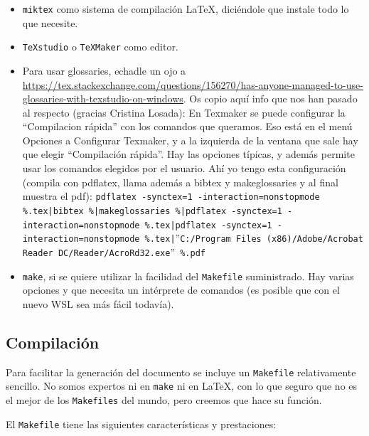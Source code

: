 \begin{itemize}
        \begin{itemize}
          \item \texttt{miktex} como sistema de compilación \LaTeX{}, diciéndole que instale todo lo que necesite.
          \item \texttt{TeXstudio} o \texttt{TeXMaker} como editor.
          \item Para usar glossaries, echadle un ojo a \url{https://tex.stackexchange.com/questions/156270/has-anyone-managed-to-use-glossaries-with-texstudio-on-windows}. Os copio aquí info que nos han pasado al respecto (gracias Cristina Losada): En Texmaker se puede configurar la “Compilacion rápida” con los comandos que queramos. Eso está en el menú Opciones a Configurar Texmaker, y a la izquierda de la ventana que sale hay que elegir “Compilación rápida”. Hay las opciones típicas, y además permite usar los comandos elegidos por el usuario. Ahí yo tengo esta configuración (compila con pdflatex, llama además a bibtex y makeglossaries y al final muestra el pdf): \texttt{pdflatex -synctex=1 -interaction=nonstopmode \%.tex|bibtex \%|makeglossaries \%|pdflatex -synctex=1 -interaction=nonstopmode \%.tex|pdflatex -synctex=1 -interaction=nonstopmode \%.tex|}''\texttt{C:/Program Files (x86)/Adobe/Acrobat Reader DC/Reader/AcroRd32.exe}''\texttt{ \%.pdf}
    \item \texttt{make}, si se quiere utilizar la facilidad del \texttt{Makefile} suministrado. Hay varias opciones y que necesita un intérprete de comandos (es posible que con el nuevo WSL sea más fácil todavía).
  \end{itemize}
\end{itemize}

\subsection{Compilación}
\label{sec:compilacion}

Para facilitar la generación del documento se incluye un \texttt{Makefile} relativamente sencillo. No somos expertos ni en \texttt{make} ni en \LaTeX, con lo que seguro que no es el mejor de los \texttt{Makefiles} del mundo, pero creemos que hace su función.

El \texttt{Makefile} tiene las siguientes características y prestaciones:

